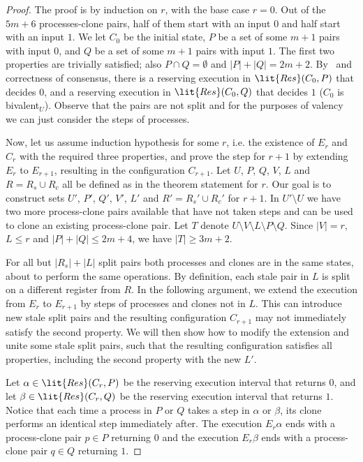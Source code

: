 \begin{proof}
The proof is by induction on $r$, with the base case $r = 0$.
Out of the $5m + 6$ processes-clone pairs, 
  half of them start with an input $0$ and half start with an input $1$.
We let $C_0$ be the initial state,
  $P$ be a set of some $m+1$ pairs with input $0$, and
  $Q$ be a set of some $m+1$ pairs with input $1$.
The first two properties are trivially satisfied; also $P \cap Q = \emptyset$ and $|P| + |Q| = 2m+2$.
By~ and correctness of consensus,
  there is a reserving execution in $\lit{Res}(C_0, P)$ that decides $0$,
  and a reserving execution in $\lit{Res}(C_0, Q)$ that decides $1$ ($C_0$ is bivalent$_U$).
Observe that the pairs are not split and for the purposes of valency we can just consider the steps of processes.

Now, let us assume induction hypothesis for some $r$, i.e. the existence of $E_r$ and $C_r$ with the required three properties,
  and prove the step for $r+1$ by extending $E_r$ to $E_{r+1}$, resulting in the configuration $C_{r+1}$.
Let $U$, $P$, $Q$, $V$, $L$ and $R = R_s \cup R_c$ all be defined as in the theorem statement for $r$. 
  Our goal is to construct sets $U'$, $P'$, $Q'$, $V'$, $L'$ and $R' = R_s' \cup R_c'$ for $r+1$. 
In $U' \setminus U$ we have two more process-clone pairs available that have not taken steps and 
  can be used to clone an existing process-clone pair.
Let $T$ denote $U \setminus V \setminus L \setminus P \setminus Q$.
Since $|V| = r$, $L \leq r$ and $|P| + |Q| \leq 2m+4$, we have $|T| \geq 3m+2$.

For all but $|R_s| + |L|$ split pairs both processes and clones are in the same states, 
  about to perform the same operations.
By definition, each stale pair in $L$ is split on a different register from $R$.
In the following argument, we extend the execution from $E_r$ to $E_{r+1}$ by steps of processes and clones not in $L$.
This can introduce new stale split pairs and the resulting configuration $C_{r+1}$ 
  may not immediately satisfy the second property.
We will then show how to modify the extension and unite some stale split pairs, 
  such that the resulting configuration satisfies all properties, including the second property with the new $L'$.
	
Let $\alpha \in \lit{Res}(C_r, P)$ be the reserving execution interval that returns $0$,
  and let $\beta \in \lit{Res}(C_r, Q)$ be the reserving execution interval that returns $1$.
Notice that each time a process in $P$ or $Q$ takes a step in $\alpha$ or $\beta$, 
  its clone performs an identical step immediately after.
The execution $E_r \alpha$ ends with a process-clone pair $p \in P$ returning $0$ and 
  the execution $E_r \beta$ ends with a process-clone pair $q \in Q$ returning $1$. 


\end{proof}
